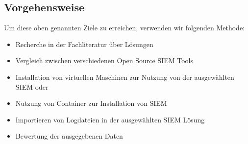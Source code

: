 \subsection{Vorgehensweise}
Um diese oben genannten Ziele zu erreichen, verwenden wir folgenden Methode:

\begin{itemize}[noitemsep]
   \item Recherche in der Fachliteratur über  Lösungen
   \item Vergleich zwischen verschiedenen \gls{Open Source} \gls{SIEM} Tools
   \item Installation von virtuellen Maschinen zur Nutzung von der ausgewählten \gls{SIEM} oder  
   \item Nutzung von Container zur Installation von \gls{SIEM}
   \item Importieren von Logdateien in der ausgewählten \gls{SIEM} Lösung
   \item Bewertung der ausgegebenen Daten
\end{itemize}


